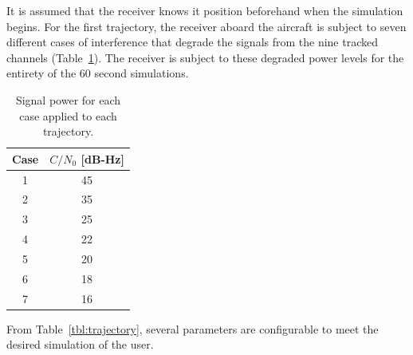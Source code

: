 It is assumed that the receiver knows it position beforehand when the simulation begins. For the first trajectory, the receiver aboard the aircraft is subject to seven different cases of interference that degrade the signals from the nine tracked channels (Table~\ref{tbl:interferenceCases}). The receiver is subject to these degraded power levels for the entirety of the 60 second simulations.

\begin{table}[!ht]
    \caption{Signal power for each case applied to each trajectory.}\label{tbl:interferenceCases}
    \centering
    \begin{tabular}{cc}
        \toprule
        Case & \(C/N_0\) [dB-Hz] \\
        \midrule
        1    & 45                \\
        2    & 35                \\
        3    & 25                \\
        4    & 22                \\
        5    & 20                \\
        6    & 18                \\
        7    & 16                \\
        \bottomrule
    \end{tabular}
\end{table}

From Table~\ref{tbl:trajectory}, several parameters are configurable to meet the desired simulation of the user.

